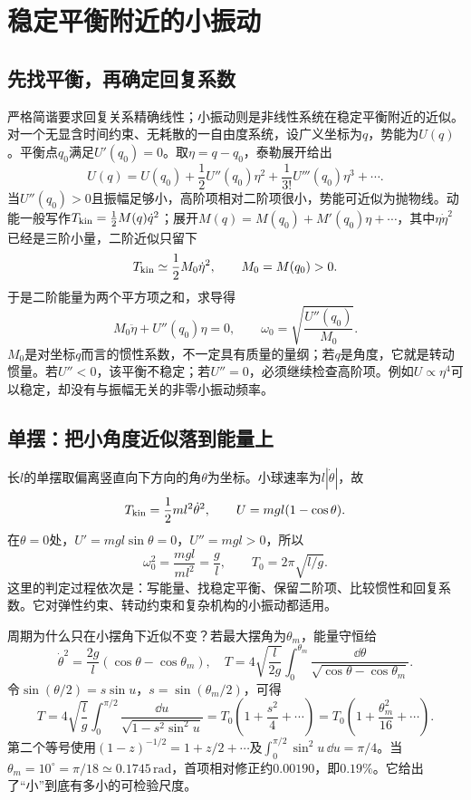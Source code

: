 \section{稳定平衡附近的小振动}\label{ch10:sec:small}
\subsection{先找平衡，再确定回复系数}
严格简谐要求回复关系精确线性；小振动则是非线性系统在稳定平衡附近的近似。对一个无显含时间约束、无耗散的一自由度系统，设广义坐标为$q$，势能为$U(q)$。平衡点$q_0$满足$U'(q_0)=0$。取$\eta=q-q_0$，泰勒展开给出
\[
 U(q)=U(q_0)+\frac12U''(q_0)\eta^2
 +\frac1{3!}U'''(q_0)\eta^3+\cdots.
\]
当$U''(q_0)>0$且振幅足够小，高阶项相对二阶项很小，势能可近似为抛物线。动能一般写作$T_{\rm kin}=\tfrac12M(q)\dot q^2$；展开$M(q)=M(q_0)+M'(q_0)\eta+\cdots$，其中$\eta\dot\eta^2$已经是三阶小量，二阶近似只留下
\[
 T_{\rm kin}\simeq\frac12M_0\dot\eta^2,\qquad M_0=M(q_0)>0.
\]
于是二阶能量为两个平方项之和，求导得
\begin{equation}\label{ch10:eq:small-frequency}
 M_0\ddot\eta+U''(q_0)\eta=0,
 \qquad \omega_0=\sqrt{\frac{U''(q_0)}{M_0}}.
\end{equation}
$M_0$是对坐标$q$而言的惯性系数，不一定具有质量的量纲；若$q$是角度，它就是转动惯量。若$U''<0$，该平衡不稳定；若$U''=0$，必须继续检查高阶项。例如$U\propto\eta^4$可以稳定，却没有与振幅无关的非零小振动频率。

\subsection{单摆：把小角度近似落到能量上}
长$l$的单摆取偏离竖直向下方向的角$\theta$为坐标。小球速率为$l|\dot\theta|$，故
\[
 T_{\rm kin}=\frac12ml^2\dot\theta^2,\qquad
 U=mgl(1-\cos\theta).
\]
在$\theta=0$处，$U'=mgl\sin\theta=0$，$U''=mgl>0$，所以
\[
 \omega_0^2=\frac{mgl}{ml^2}=\frac gl,\qquad
 T_0=2\pi\sqrt{l/g}.
\]
这里的判定过程依次是：写能量、找稳定平衡、保留二阶项、比较惯性和回复系数。它对弹性约束、转动约束和复杂机构的小振动都适用。

周期为什么只在小摆角下近似不变？若最大摆角为$\theta_m$，能量守恒给
\[
 \dot\theta^2=\frac{2g}{l}(\cos\theta-\cos\theta_m),\quad
 T=4\sqrt{\frac l{2g}}\int_0^{\theta_m}
 \frac{\dd\theta}{\sqrt{\cos\theta-\cos\theta_m}}.
\]
令$\sin(\theta/2)=s\sin u$，$s=\sin(\theta_m/2)$，可得
\[
 T=4\sqrt{\frac lg}\int_0^{\pi/2}\frac{\dd u}{\sqrt{1-s^2\sin^2u}}
 =T_0\left(1+\frac{s^2}{4}+\cdots\right)
 =T_0\left(1+\frac{\theta_m^2}{16}+\cdots\right).
\]
第二个等号使用$(1-z)^{-1/2}=1+z/2+\cdots$及$\int_0^{\pi/2}\sin^2u\,\dd u=\pi/4$。当$\theta_m=10^\circ=\pi/18\simeq0.1745\,\mathrm{rad}$，首项相对修正约$0.00190$，即$0.19\%$。它给出了“小”到底有多小的可检验尺度。

